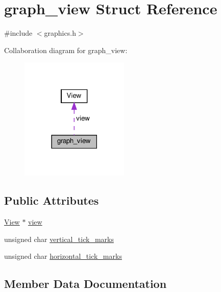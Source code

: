 \hypertarget{structgraph__view}{}\section{graph\+\_\+view Struct Reference}
\label{structgraph__view}


{\ttfamily \#include $<$graphics.\+h$>$}



Collaboration diagram for graph\+\_\+view\+:
\nopagebreak
\begin{figure}[H]
\begin{center}
\leavevmode
\includegraphics[width=146pt]{structgraph__view__coll__graph}
\end{center}
\end{figure}
\subsection*{Public Attributes}
\begin{DoxyCompactItemize}
\item 
\hyperlink{structView}{View} $\ast$ \hyperlink{structgraph__view_a44e9bb5000071005cad8bf8fe330ad45}{view}
\item 
unsigned char \hyperlink{structgraph__view_aea851ba75c3cf634c25aa11fcb08299c}{vertical\+\_\+tick\+\_\+marks}
\item 
unsigned char \hyperlink{structgraph__view_ac28c09dcb169d06d829dd6aed28f8685}{horizontal\+\_\+tick\+\_\+marks}
\end{DoxyCompactItemize}


\subsection{Member Data Documentation}
\mbox{\label{structgraph__view_ac28c09dcb169d06d829dd6aed28f8685}} 
